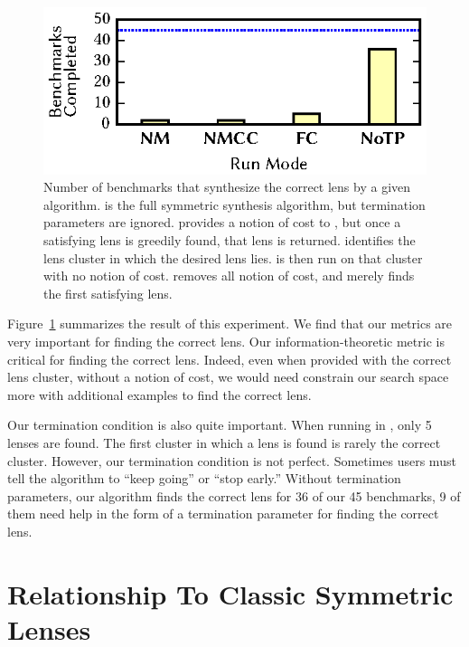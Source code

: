 \documentclass[acmsmall,screen,anonymous]{acmart}
\begin{document}
\begin{figure}
  \includegraphics{generated-graphs/metrics_importance}
  \caption{Number of benchmarks that synthesize the correct lens by a given
    algorithm. \NoTPOpt{} is the full symmetric synthesis algorithm, but
    termination parameters are ignored. \FCOpt{} provides a notion of cost to
    \GreedySynth, but once a satisfying lens is greedily found, that lens is
    returned. \NMCCOpt{} identifies the lens cluster in which the desired 
    lens lies.  \GreedySynth{} is then run on that cluster with no notion of
    cost. \NMOpt{} removes all notion of cost, and merely finds the first
    satisfying lens.} 
  \label{fig:metric}
\end{figure}

Figure~\ref{fig:metric} summarizes the result of this experiment. We find that
our metrics are very important for finding the correct lens. Our
information-theoretic metric is critical for finding the correct lens. Indeed,
even when provided with the correct lens cluster, without a notion of cost, we
would need constrain our search space more with additional examples to find the
correct lens.

Our termination condition is also quite important. When running in \FCOpt{},
only 5 lenses are found. The first cluster in which a lens is found is rarely
the correct cluster. However, our termination condition is not perfect.
Sometimes users must tell the algorithm to ``keep going'' or ``stop early.''
Without termination parameters, our algorithm finds the correct lens for 36 of
our 45 benchmarks, 9 of them need help in the form of a termination parameter
for finding the correct lens.

\section{Relationship To Classic Symmetric Lenses}
\label{sec:relationship}
\end{document}
